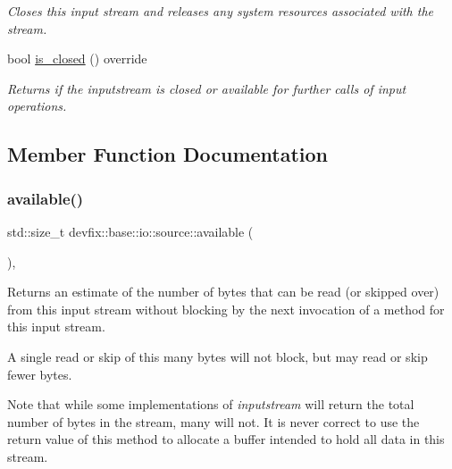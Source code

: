\begin{DoxyCompactItemize}
\begin{DoxyCompactList}\small\item\em Closes this input stream and releases any system resources associated with the stream. \end{DoxyCompactList}\item 
bool \hyperlink{structdevfix_1_1base_1_1io_1_1source_a406834cf6651d48949b96d0ef49cc6c1}{is\+\_\+closed} () override
\begin{DoxyCompactList}\small\item\em Returns if the {\itshape inputstream} is closed or available for further calls of input operations. \end{DoxyCompactList}\end{DoxyCompactItemize}


\subsection{Member Function Documentation}
\mbox{\label{structdevfix_1_1base_1_1io_1_1source_a911f4ba79499a623de30cf16d3d26d47}} 
\subsubsection{\texorpdfstring{available()}{available()}}
{\footnotesize\ttfamily std\+::size\+\_\+t devfix\+::base\+::io\+::source\+::available (\begin{DoxyParamCaption}{ }\end{DoxyParamCaption})\hspace{0.3cm}{\ttfamily [override]}, {\ttfamily [virtual]}}



Returns an estimate of the number of bytes that can be read (or skipped over) from this input stream without blocking by the next invocation of a method for this input stream. 

A single read or skip of this many bytes will not block, but may read or skip fewer bytes.

Note that while some implementations of {\itshape inputstream} will return the total number of bytes in the stream, many will not. It is never correct to use the return value of this method to allocate a buffer intended to hold all data in this stream.

